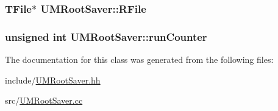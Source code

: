 \subsubsection[{R\+File}]{\setlength{\rightskip}{0pt plus 5cm}T\+File$\ast$ U\+M\+Root\+Saver\+::\+R\+File\hspace{0.3cm}{\ttfamily [private]}}\label{classUMRootSaver_ad7ffe5037296689e41b7c161afa3cee3}
\hypertarget{classUMRootSaver_a99af4bcf69b6a924398e5f9f4c55dd0f}{}
\subsubsection[{run\+Counter}]{\setlength{\rightskip}{0pt plus 5cm}unsigned int U\+M\+Root\+Saver\+::run\+Counter\hspace{0.3cm}{\ttfamily [private]}}\label{classUMRootSaver_a99af4bcf69b6a924398e5f9f4c55dd0f}


The documentation for this class was generated from the following files\+:\begin{DoxyCompactItemize}
\item 
include/\hyperlink{UMRootSaver_8hh}{U\+M\+Root\+Saver.\+hh}\item 
src/\hyperlink{UMRootSaver_8cc}{U\+M\+Root\+Saver.\+cc}\end{DoxyCompactItemize}
